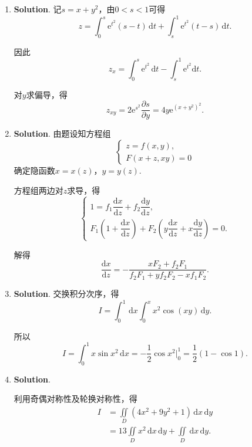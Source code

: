 \documentclass[../Main.tex]{subfiles}
\begin{document}
\begin{enumerate}
    \item \textbf{Solution}. 记$s=x+y^{2}$，由$0<s<1$可得
          \[
              z=\int_{0}^{s}\mathrm{e}^{t^{2}}(s-t)\,\mathrm{d}t+\int_{s}^{1}\mathrm{e}^{t^{2}}
              (t-s)\,\mathrm{d}t.
          \]

          因此
          \[
              z_{x}=\int_{0}^{s}\mathrm{e}^{t^{2}}\,\mathrm{d}t-\int_{s}^{1}\mathrm{e}^{t^{2}}
              \mathrm{d}t.
          \]

          对$y$求偏导，得
          \[
              z_{xy}=2\mathrm{e}^{s^{2}}\frac{\partial s}{\partial y}=4y\mathrm{e}^{(x+y^{2})^{2}}
              .
          \]

    \item \textbf{Solution}. 由题设知方程组
          \[
              \begin{cases}
                  z=f(x,y), \\
                  F(x+z,xy)=0
              \end{cases}
          \]
          确定隐函数$x=x(z)$，$y=y(z)$.

          方程组两边对$z$求导，得
          \[
              \begin{cases}
                  1=f_{1}\dfrac{\mathrm{d}x}{\mathrm{d}z}+f_{2}\dfrac{\mathrm{d}y}{\mathrm{d}z}, \\[8pt]
                  F_{1}\left(1+\dfrac{\mathrm{d}x}{\mathrm{d}z}\right) +F_{2}\left(y\dfrac{\mathrm{d}x}{\mathrm{d}z}+x\dfrac{\mathrm{d}y}{\mathrm{d}z}\right)=0.
              \end{cases}
          \]

          解得
          \[
              \frac{\mathrm{d}x}{\mathrm{d}z}=-\frac{xF_{2}+f_{2}F_{1}}{f_{2}F_{1}+yf_{2}F_{2}-xf_{1}F_{2}}
              .
          \]

    \item \textbf{Solution}. 交换积分次序，得
          \[
              I=\int_{0}^{1}\,\mathrm{d}x\int_{0}^{x}x^{2}\cos(xy)\,\mathrm{d}y.
          \]

          所以
          \[
              I=\int_{0}^{1}x\sin x^{2}\,\mathrm{d}x =-\frac{1}{2}\cos x^{2}\bigg|_{0}^{1}
              =\frac{1}{2}(1-\cos1).
          \]

    \item \textbf{Solution}.

          \noindent
          \begin{minipage}[c]{0.62\textwidth}
              利用奇偶对称性及轮换对称性，得
              \[
                  \begin{aligned}
                      I & =\iint\limits_{D}(4x^{2}+9y^{2}+1)\,\mathrm{d}x\,\mathrm{d}y                                   \\
                        & =13\iint\limits_{D}x^{2}\,\mathrm{d}x\,\mathrm{d}y+\iint\limits_{D}\,\mathrm{d}x\,\mathrm{d}y.
                  \end{aligned}
              \]


\end{minipage}
\end{enumerate}
\end{document}
